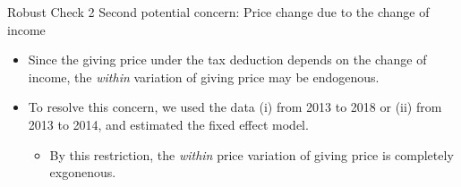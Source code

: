 \documentclass[
  ignorenonframetext,
  aspectratio=169,
]{beamer}
\providecommand{\tightlist}{%
  \setlength{\itemsep}{0pt}\setlength{\parskip}{0pt}}
\begin{document}
\begin{frame}{Robust Check 2}
\protect\hypertarget{robust-check-2}{}
Second potential concern: Price change due to the change of income

\begin{itemize}
\tightlist
\item
  Since the giving price under the tax deduction depends on the change of income, the \emph{within} variation of giving price may be endogenous.
\item
  To resolve this concern, we used the data (i) from 2013 to 2018 or (ii) from 2013 to 2014, and estimated the fixed effect model.

  \begin{itemize}
  \tightlist
  \item
    By this restriction, the \emph{within} price variation of giving price is completely exgonenous.
  \end{itemize}
\end{itemize}
\end{frame}
\end{document}
